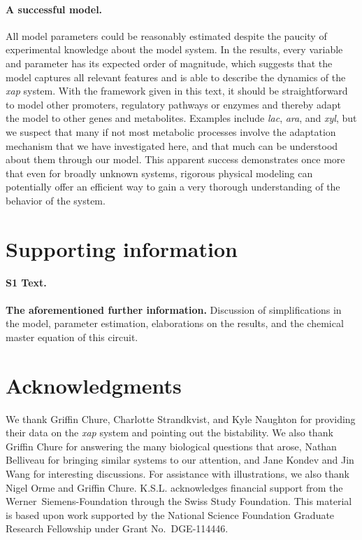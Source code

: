 \documentclass[10pt,letterpaper]{article}
\begin{document}
\paragraph*{A successful model.}
All model parameters could be reasonably estimated despite the paucity of
experimental knowledge about the model system. In the results, every
variable and parameter 
has its expected order of magnitude, which suggests
that the model captures all relevant features and is able to describe the
dynamics of the \emph{xap} system. With the framework given in this text, it
should be straightforward to model other promoters, regulatory pathways or
enzymes and thereby adapt the model to other genes and metabolites. Examples
include \emph{lac}, \emph{ara}, and \emph{xyl}, but we suspect that many if
not most metabolic processes involve the adaptation mechanism that we have
investigated here, and that much can be understood about them through our
model. This apparent success demonstrates once more that even for broadly
unknown systems, rigorous physical modeling can potentially offer an
efficient way to gain a very thorough understanding of the behavior of the
system. 



\section*{Supporting information}
\paragraph*{S1 Text.}
\label{S1_Text}
{\bf The aforementioned further information.} Discussion of simplifications
in the model, parameter estimation, elaborations on the results, and the
chemical master equation of this circuit.

\section*{Acknowledgments}
We thank Griffin Chure, Charlotte Strandkvist, and Kyle Naughton for
providing their data on the \emph{xap} system and pointing out the
bistability. We also thank Griffin Chure for answering the many biological
questions that arose, Nathan Belliveau for bringing similar systems to our
attention, and Jane Kondev and Jin Wang for interesting discussions.
For assistance with illustrations, we also thank Nigel Orme and Griffin Chure.
K.S.L. acknowledges financial support from the
Werner~Siemens-Foundation through the Swiss Study Foundation.
This material is based upon work supported by the National Science Foundation
Graduate Research Fellowship under Grant No.\ DGE-114446.
\end{document}
